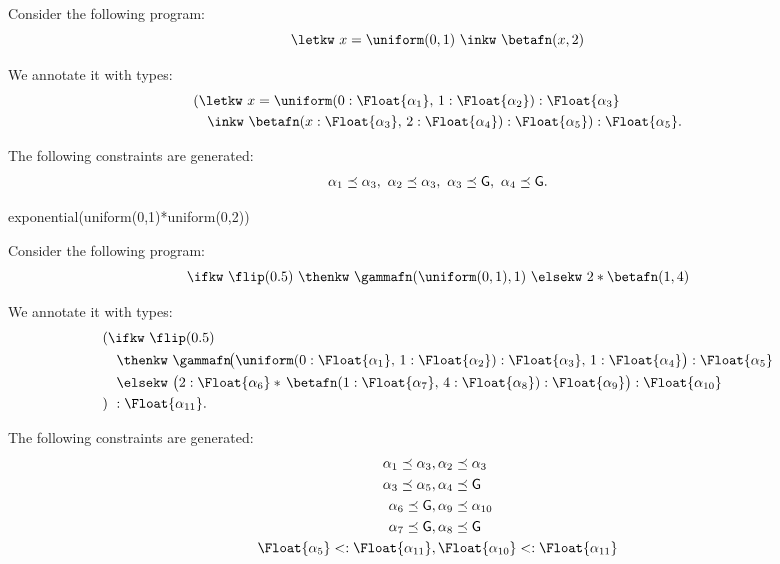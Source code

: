 \begin{example}
    Consider the following program:
    \[
        \letkw\ x = \uniform(0,1)\ \inkw\ \betafn(x, 2)
    \]

    We annotate it with types:
    \[
    \begin{aligned}
      &(\letkw\ x = \uniform(0 : \Float{\alpha_1},\, 1 : \Float{\alpha_2}) : \Float{\alpha_3} \\
      &\quad \inkw\ \betafn(x : \Float{\alpha_3},\, 2 : \Float{\alpha_4}) : \Float{\alpha_5}) : \Float{\alpha_5}.
    \end{aligned}
    \]

    The following constraints are generated:
    \begin{align*}
      \alpha_1 \preceq \alpha_3,\ \alpha_2 \preceq \alpha_3,\ \alpha_3 \preceq \mathsf{G},\ \alpha_4 \preceq \mathsf{G}.
    \end{align*}

\end{example}

\begin{example}
  exponential(uniform(0,1)*uniform(0,2))
\end{example}

\begin{example}
    Consider the following program:
    \[
    \ifkw\ \flip(0.5)\ \thenkw\ \gammafn(\uniform(0,1), 1)\ \elsekw\ 2 * \betafn(1,4)
    \]
    
    We annotate it with types:
    \[
    \begin{aligned}
    &(\ifkw\ \flip(0.5) \\
    &\quad \thenkw\ \gammafn\!\big(
      \uniform(0 : \Float{\alpha_1},\, 1 : \Float{\alpha_2}) : \Float{\alpha_3},\,
      1 : \Float{\alpha_4}
    \big) : \Float{\alpha_5} \\
    &\quad \elsekw\ \big(
      2 : \Float{\alpha_6}
      *\,
      \betafn(1 : \Float{\alpha_7},\, 4 : \Float{\alpha_8}) : \Float{\alpha_9}
    \big) : \Float{\alpha_{10}} \\
    &)\ : \Float{\alpha_{11}}.
    \end{aligned}
    \]
    
  The following constraints are generated:
  \begin{align*}
      \alpha_1 \preceq \alpha_3 &, \alpha_2 \preceq \alpha_3 \\
      \alpha_3 \preceq \alpha_5 &, \alpha_4 \preceq \G \\
      \alpha_6 \preceq \G &, \alpha_9 \preceq \alpha_{10} \\
      \alpha_7 \preceq \G &, \alpha_8 \preceq \G \\
      \Float{\alpha_5} <: \Float{\alpha_{11}} &, \Float{\alpha_{10}} <: \Float{\alpha_{11}}
  \end{align*}
\end{example}

